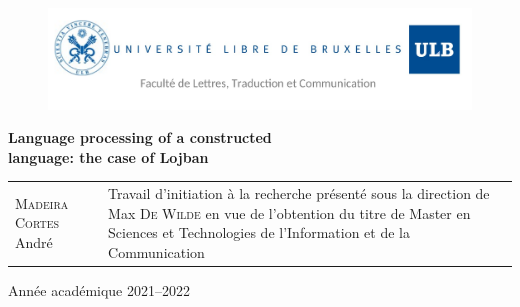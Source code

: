 

\usepackage[
    backend=bibtex, style=authortitle, defernumbers=true,
]{biblatex}







\begin{titlingpage}

\begin{figure}[H]
\vspace{-2cm}
\hspace{-2.5cm}
\includegraphics[scale=0.30]{images/header.png}
\end{figure}

\vfill

\begin{center}
\hspace{-0.5cm}
\Huge{\textbf{Language processing of a constructed \\language: the case of Lojban}}\\
\end{center}

\vfill

\begin{tabular}{b{6.5cm}b{7.5cm}}
\textsc{Madeira Cortes} André & Travail d'initiation à la recherche présenté sous la direction de Max \textsc{De Wilde}
en vue de l'obtention du titre de Master en Sciences et Technologies de l'Information et de la Communication\\
\end{tabular}

\vfill

\begin{center}
\Large Année académique 2021--2022
\end{center}

\end{titlingpage}

